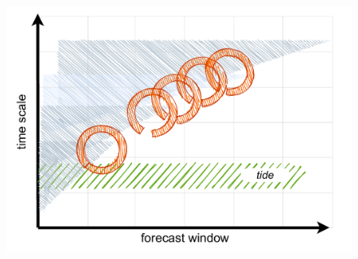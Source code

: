 \begin{frame}
\begin{minipage}{1.0\textwidth}
\begin{columns}
    \begin{column}{0.4\textwidth}
    \begin{figure}      
        \includegraphics[width=\textwidth]{figures/diagrams/scales_with_broken_chain.pdf}
    \end{figure}
    \end{column}
    
\end{columns}
\end{minipage}

\end{frame}